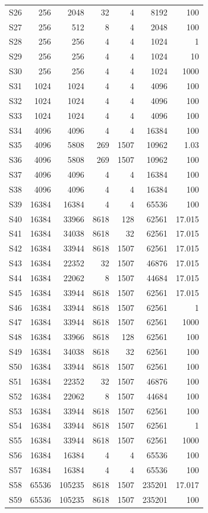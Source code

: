 {\begin{longtable}{lrrrrrr}
S26 & 256 & 2048 & 32 & 4 & 8192 & 100\\
S27 & 256 & 512 & 8 & 4 & 2048 & 100\\
S28 & 256 & 256 & 4 & 4 & 1024 & 1\\
S29 & 256 & 256 & 4 & 4 & 1024 & 10\\
S30 & 256 & 256 & 4 & 4 & 1024 & 1000\\
S31 & 1024 & 1024 & 4 & 4 & 4096 & 100\\
S32 & 1024 & 1024 & 4 & 4 & 4096 & 100\\
S33 & 1024 & 1024 & 4 & 4 & 4096 & 100\\
S34 & 4096 & 4096 & 4 & 4 & 16384 & 100\\
S35 & 4096 & 5808 & 269 & 1507 & 10962 & 1.03\\
S36 & 4096 & 5808 & 269 & 1507 & 10962 & 100\\
S37 & 4096 & 4096 & 4 & 4 & 16384 & 100\\
S38 & 4096 & 4096 & 4 & 4 & 16384 & 100\\
S39 & 16384 & 16384 & 4 & 4 & 65536 & 100\\
S40 & 16384 & 33966 & 8618 & 128 & 62561 & 17.015\\
S41 & 16384 & 34038 & 8618 & 32 & 62561 & 17.015\\
S42 & 16384 & 33944 & 8618 & 1507 & 62561 & 17.015\\
S43 & 16384 & 22352 & 32 & 1507 & 46876 & 17.015\\
S44 & 16384 & 22062 & 8 & 1507 & 44684 & 17.015\\
S45 & 16384 & 33944 & 8618 & 1507 & 62561 & 17.015\\
S46 & 16384 & 33944 & 8618 & 1507 & 62561 & 1\\
S47 & 16384 & 33944 & 8618 & 1507 & 62561 & 1000\\
S48 & 16384 & 33966 & 8618 & 128 & 62561 & 100\\
S49 & 16384 & 34038 & 8618 & 32 & 62561 & 100\\
S50 & 16384 & 33944 & 8618 & 1507 & 62561 & 100\\
S51 & 16384 & 22352 & 32 & 1507 & 46876 & 100\\
S52 & 16384 & 22062 & 8 & 1507 & 44684 & 100\\
S53 & 16384 & 33944 & 8618 & 1507 & 62561 & 100\\
S54 & 16384 & 33944 & 8618 & 1507 & 62561 & 1\\
S55 & 16384 & 33944 & 8618 & 1507 & 62561 & 1000\\
S56 & 16384 & 16384 & 4 & 4 & 65536 & 100\\
S57 & 16384 & 16384 & 4 & 4 & 65536 & 100\\
S58 & 65536 & 105235 & 8618 & 1507 & 235201 & 17.017\\
S59 & 65536 & 105235 & 8618 & 1507 & 235201 & 100\\
\end{longtable}
}

